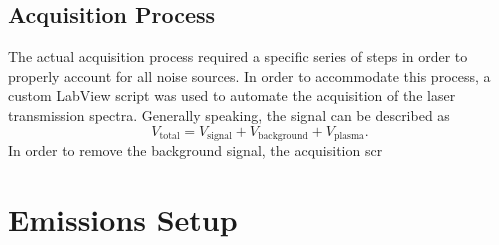 \subsection{Acquisition Process} The actual acquisition process required
a specific series of steps in order to properly account for all noise
sources. In order to accommodate this process, a custom LabView script
was used to automate the acquisition of the laser transmission spectra.
Generally speaking, the signal can be described as
\begin{equation}
  V_\mathrm{total} = V_\mathrm{signal} + V_\mathrm{background} +
                     V_\mathrm{plasma}.
\end{equation}
In order to remove the background signal, the acquisition scr

\section{Emissions Setup}
